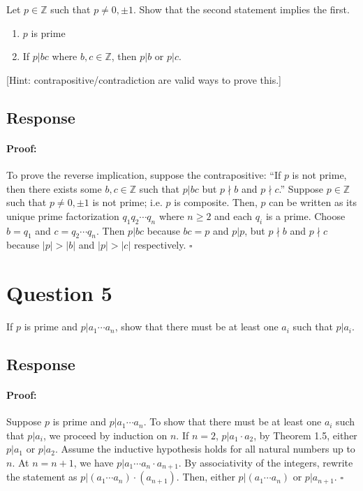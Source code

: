 \documentclass [12pt] {article}
\newcommand{\Z}{\mathbb{Z}}
\newenvironment{proof}{\paragraph{Proof:}}{\hfill$\square$}
\begin{document}
Let $p\in\Z$ such that $p\neq 0,\pm1$. Show that the second statement implies the first.
	\begin{enumerate}
        \item $p$ is prime 
		\item If $p|bc$ where $b,c\in\Z$, then $p|b$ or $p|c$.
	\end{enumerate}

[Hint: contrapositive/contradiction are valid ways to prove this.]

\subsection*{Response}
\begin{proof}
    To prove the reverse implication, suppose the contrapositive: ``If $p$ is not prime, then there 
    exists some $b, c \in \Z$ such that $p | bc$ but $p \nmid b$ and $p \nmid c$.'' Suppose $p \in 
    \Z$ such that $p \neq 0, \pm 1$ is not prime; i.e. $p$ is composite. Then, $p$ can be written 
    as its unique prime factorization $q_1 q_2 \cdots q_n$ where $n \geq 2$ and each $q_i$ is a prime. Choose $b = q_1$ and 
    $c = q_2 \cdots q_n$. Then $p | bc$ because $bc = p$ and $p | p$, but $p \nmid b$ and $p \nmid c$
    because $|p| > |b|$ and $|p| > |c|$ respectively.
\end{proof}



\newpage

\section*{Question 5}
If $p$ is prime and $p|a_1 \cdots a_n$, show that there must be at least one $a_i$ such that $p|a_i$. 

\subsection*{Response}
\begin{proof}
    Suppose $p$ is prime and $p | a_1 \cdots a_n$. To show that there must be at least one $a_i$ 
    such that $p | a_i$, we proceed by induction on $n$. If $n = 2$, $p | a_1 \cdot a_2$, by 
    Theorem 1.5, either $p | a_1$ or $p | a_2$. Assume the inductive hypothesis holds for all 
    natural numbers up to $n$. At $n = n + 1$, we have $p | a_1 \cdots a_n \cdot a_{n + 1}$. By 
    associativity of the integers, rewrite the statement as 
    $p | (a_1 \cdots a_n) \cdot (a_{n + 1})$. Then, either $p | (a_1 \cdots a_n)$ or $p | a_{n + 1}$.
\end{proof}
\newpage
\end{document}
